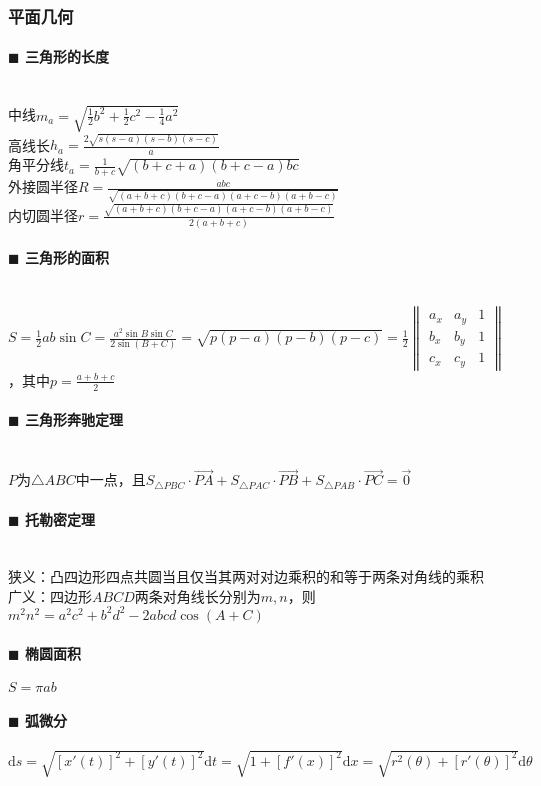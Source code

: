 \subsubsection{平面几何}
\paragraph{$\blacksquare$ 三角形的长度}
\noindent \\
中线$m_a=\sqrt{\frac{1}{2} b^2+\frac{1}{2} c^2-\frac{1}{4} a^2}$\\
高线长$h_a=\frac{2\sqrt{s(s-a)(s-b)(s-c)}}{a}$\\
角平分线$t_a=\frac{1}{b+c} \sqrt{(b+c+a)(b+c-a)bc}$\\
外接圆半径$R=\frac{abc}{\sqrt{(a+b+c)(b+c-a)(a+c-b)(a+b-c)}}$\\
内切圆半径$r=\frac{\sqrt{(a+b+c)(b+c-a)(a+c-b)(a+b-c)}}{2(a+b+c)}$
\paragraph{$\blacksquare$ 三角形的面积}
\noindent \\
$S=\frac{1}{2} ab\sin C=\frac{a^2\sin B\sin C}{2\sin (B+C)}=\sqrt{p(p-a)(p-b)(p-c)}=\frac{1}{2}\begin{Vmatrix} a_x & a_y & 1\\ b_x & b_y & 1\\ c_x & c_y & 1 \end{Vmatrix}$，其中$p=\frac{a+b+c}{2}$
\paragraph{$\blacksquare$ 三角形奔驰定理}
\noindent \\
$P$为$\triangle ABC$中一点，且$S_{\triangle PBC} \cdot \overrightarrow{PA}+S_{\triangle PAC} \cdot \overrightarrow{PB}+S_{\triangle PAB} \cdot \overrightarrow{PC}=\vec 0$
\paragraph{$\blacksquare$ 托勒密定理}
\noindent \\
狭义：凸四边形四点共圆当且仅当其两对对边乘积的和等于两条对角线的乘积\\
广义：四边形$ABCD$两条对角线长分别为$m, n$，则$m^2 n^2=a^2 c^2+b^2 d^2-2abcd \cos(A+C)$
\paragraph{$\blacksquare$ 椭圆面积}
$S=\pi ab$
\paragraph{$\blacksquare$ 弧微分}
$\mathrm{d}s=\sqrt{[x'(t)]^2+[y'(t)]^2} \mathrm{d} t=\sqrt{1+[f'(x)]^2} \mathrm{d} x=\sqrt{r^2(\theta)+[r'(\theta)]^2} \mathrm{d} \theta$

